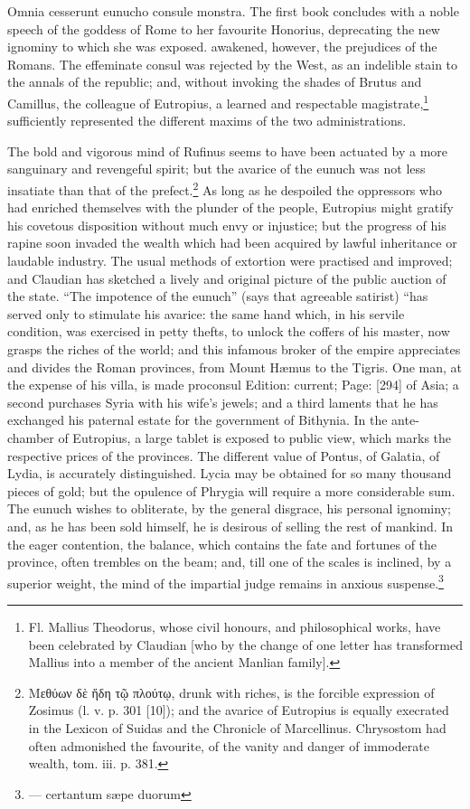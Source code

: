 {Omnia cesserunt eunucho consule monstra. The first book concludes with a noble speech of the goddess of Rome to her favourite Honorius, deprecating the new ignominy to which she was exposed.} awakened, however, the prejudices of the Romans. The effeminate consul was rejected by the West, as an indelible stain to the annals of the republic; and, without invoking the shades of Brutus and Camillus, the colleague of Eutropius, a learned and respectable magistrate,\footnote{Fl. Mallius Theodorus, whose civil honours, and philosophical works, have been celebrated by Claudian [who by the change of one letter has transformed Mallius into a member of the ancient Manlian family].} sufficiently represented the different maxims of the two administrations.

The bold and vigorous mind of Rufinus seems to have been actuated by a more sanguinary and revengeful spirit; but the avarice of the eunuch was not less insatiate than that of the prefect.\footnote{\textgreek{Μεθύων δ\texthebrew{ὲ ἤ}δη τ\texthebrew{ῷ} πλούτ\texthebrew{ῳ}}, drunk with riches, is the forcible expression of Zosimus (l. v. p. 301 [10]); and the avarice of Eutropius is equally execrated in the Lexicon of Suidas and the Chronicle of Marcellinus. Chrysostom had often admonished the favourite, of the vanity and danger of immoderate wealth, tom. iii. p. 381.} As long as he despoiled the oppressors who had enriched themselves with the plunder of the people, Eutropius might gratify his covetous disposition without much envy or injustice; but the progress of his rapine soon invaded the wealth which had been acquired by lawful inheritance or laudable industry. The usual methods of extortion were practised and improved; and Claudian has sketched a lively and original picture of the public auction of the state. \texthebrew{“}The impotence of the eunuch\texthebrew{}” (says that agreeable satirist) \texthebrew{“}has served only to stimulate his avarice: the same hand which, in his servile condition, was exercised in petty thefts, to unlock the coffers of his master, now grasps the riches of the world; and this infamous broker of the empire appreciates and divides the Roman provinces, from Mount Hæmus to the Tigris. One man, at the expense of his villa, is made proconsul Edition: current; Page: [294] of Asia; a second purchases Syria with his wife\texthebrew{}’s jewels; and a third laments that he has exchanged his paternal estate for the government of Bithynia. In the ante-chamber of Eutropius, a large tablet is exposed to public view, which marks the respective prices of the provinces. The different value of Pontus, of Galatia, of Lydia, is accurately distinguished. Lycia may be obtained for so many thousand pieces of gold; but the opulence of Phrygia will require a more considerable sum. The eunuch wishes to obliterate, by the general disgrace, his personal ignominy; and, as he has been sold himself, he is desirous of selling the rest of mankind. In the eager contention, the balance, which contains the fate and fortunes of the province, often trembles on the beam; and, till one of the scales is inclined, by a superior weight, the mind of the impartial judge remains in anxious suspense.\footnote{\texthebrew{—} certantum sæpe duorum

}
